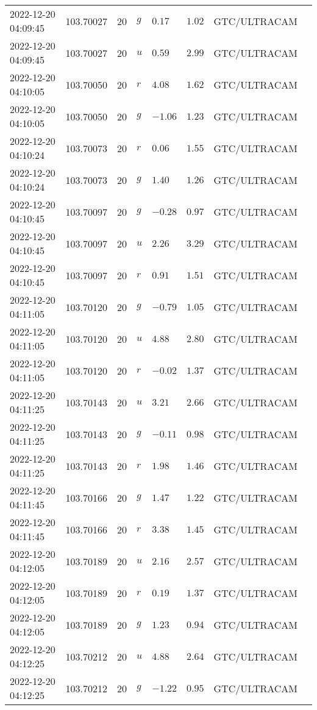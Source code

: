 \documentclass{nature_plusfigure}
\begin{document}
\begin{supplement}
\begin{center}
\begin{longtable}{llllllll}
2022-12-20 04:09:45 & 103.70027 & 20 & $g$ & $0.17$ & $1.02$ & GTC/ULTRACAM &  \\ 
2022-12-20 04:09:45 & 103.70027 & 20 & $u$ & $0.59$ & $2.99$ & GTC/ULTRACAM &  \\ 
2022-12-20 04:10:05 & 103.70050 & 20 & $r$ & $4.08$ & $1.62$ & GTC/ULTRACAM &  \\ 
2022-12-20 04:10:05 & 103.70050 & 20 & $g$ & $-1.06$ & $1.23$ & GTC/ULTRACAM &  \\ 
2022-12-20 04:10:24 & 103.70073 & 20 & $r$ & $0.06$ & $1.55$ & GTC/ULTRACAM &  \\ 
2022-12-20 04:10:24 & 103.70073 & 20 & $g$ & $1.40$ & $1.26$ & GTC/ULTRACAM &  \\ 
2022-12-20 04:10:45 & 103.70097 & 20 & $g$ & $-0.28$ & $0.97$ & GTC/ULTRACAM &  \\ 
2022-12-20 04:10:45 & 103.70097 & 20 & $u$ & $2.26$ & $3.29$ & GTC/ULTRACAM &  \\ 
2022-12-20 04:10:45 & 103.70097 & 20 & $r$ & $0.91$ & $1.51$ & GTC/ULTRACAM &  \\ 
2022-12-20 04:11:05 & 103.70120 & 20 & $g$ & $-0.79$ & $1.05$ & GTC/ULTRACAM &  \\ 
2022-12-20 04:11:05 & 103.70120 & 20 & $u$ & $4.88$ & $2.80$ & GTC/ULTRACAM &  \\ 
2022-12-20 04:11:05 & 103.70120 & 20 & $r$ & $-0.02$ & $1.37$ & GTC/ULTRACAM &  \\ 
2022-12-20 04:11:25 & 103.70143 & 20 & $u$ & $3.21$ & $2.66$ & GTC/ULTRACAM &  \\ 
2022-12-20 04:11:25 & 103.70143 & 20 & $g$ & $-0.11$ & $0.98$ & GTC/ULTRACAM &  \\ 
2022-12-20 04:11:25 & 103.70143 & 20 & $r$ & $1.98$ & $1.46$ & GTC/ULTRACAM &  \\ 
2022-12-20 04:11:45 & 103.70166 & 20 & $g$ & $1.47$ & $1.22$ & GTC/ULTRACAM &  \\ 
2022-12-20 04:11:45 & 103.70166 & 20 & $r$ & $3.38$ & $1.45$ & GTC/ULTRACAM &  \\ 
2022-12-20 04:12:05 & 103.70189 & 20 & $u$ & $2.16$ & $2.57$ & GTC/ULTRACAM &  \\ 
2022-12-20 04:12:05 & 103.70189 & 20 & $r$ & $0.19$ & $1.37$ & GTC/ULTRACAM &  \\ 
2022-12-20 04:12:05 & 103.70189 & 20 & $g$ & $1.23$ & $0.94$ & GTC/ULTRACAM &  \\ 
2022-12-20 04:12:25 & 103.70212 & 20 & $u$ & $4.88$ & $2.64$ & GTC/ULTRACAM &  \\ 
2022-12-20 04:12:25 & 103.70212 & 20 & $g$ & $-1.22$ & $0.95$ & GTC/ULTRACAM &  \\ 

\end{longtable}
\end{center}
\end{supplement}
\end{document}
